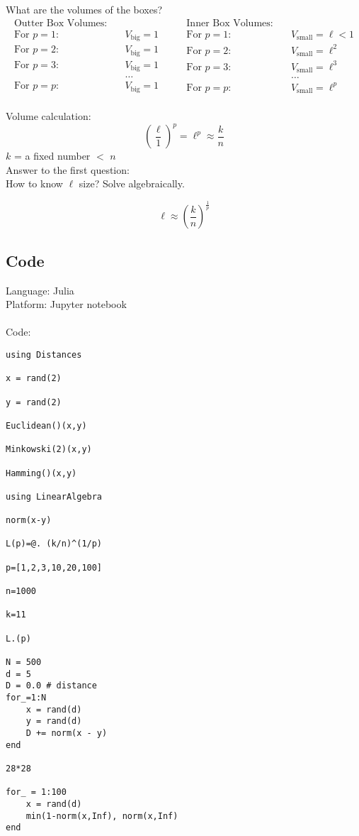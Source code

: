 What are the volumes of the boxes?
\[
    \begin{aligned}
        \text{Outter Box Volumes:} \quad\\
        \text{For } p=1: \quad & V_{\text{big}} = 1 \\
        \text{For } p=2: \quad & V_{\text{big}} = 1 \\
        \text{For } p=3: \quad & V_{\text{big}} = 1 \\
        & \dots \\
        \text{For } p=p: \quad & V_{\text{big}} = 1 \\
        \end{aligned}
        \quad \quad
        \begin{aligned}
        \text{Inner Box Volumes:} \quad\\
        \text{For } p=1: \quad & V_{\text{small}} = \ell < 1 \\
        \text{For } p=2: \quad & V_{\text{small}} = \ell^2 \\
        \text{For } p=3: \quad & V_{\text{small}} = \ell^3 \\
        & \dots \\
        \text{For } p=p: \quad & V_{\text{small}} = \ell^p \\
    \end{aligned}
\]

Volume calculation:
\[
    \left(\frac{\ell}{1}\right)^p = \ell^p \approx \frac{k}{n}
\]
$k$ = a fixed number $<$ $n$ \\

Answer to the first question: \\
How to know $\ell$ size? Solve algebraically.

\[
    \ell \approx \left(\frac{k}{n}\right)^\frac{1}{p}
\]

\subsection{Code}
Language: Julia\\
Platform: Jupyter notebook\\\\
Code:\\
\begin{verbatim}
using Distances

x = rand(2) 

y = rand(2)

Euclidean()(x,y)

Minkowski(2)(x,y)

Hamming()(x,y)

using LinearAlgebra 

norm(x-y)

L(p)=@. (k/n)^(1/p)

p=[1,2,3,10,20,100]

n=1000

k=11

L.(p)

N = 500
d = 5
D = 0.0 # distance
for_=1:N
    x = rand(d)
    y = rand(d)
    D += norm(x - y)
end

28*28

for_ = 1:100
    x = rand(d)
    min(1-norm(x,Inf), norm(x,Inf)
end
\end{verbatim}

